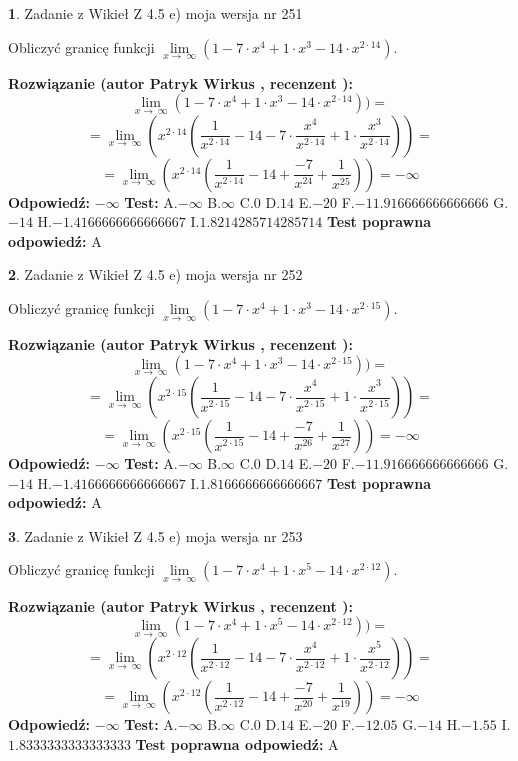 \documentclass[12pt, a4paper]{article}
\theoremstyle{definition} %
\newtheorem{zad}{}
\newcommand{\zadStart}[1]{\begin{zad}#1\newline}
\newcommand{\zadStop}{\end{zad}}
\newcommand{\rozwStart}[2]{\noindent \textbf{Rozwiązanie (autor #1 , recenzent #2): }\newline}
\newcommand{\rozwStop}{\newline}
\newcommand{\odpStart}{\noindent \textbf{Odpowiedź:}\newline}
\newcommand{\odpStop}{\newline}
\newcommand{\testStart}{\noindent \textbf{Test:}\newline}
\newcommand{\testStop}{\newline}
\newcommand{\kluczStart}{\noindent \textbf{Test poprawna odpowiedź:}\newline}
\newcommand{\kluczStop}{\newline}
\begin{document}
\zadStart{Zadanie z Wikieł Z 4.5 e) moja wersja nr 251}


Obliczyć granicę funkcji  $\lim\limits_{x\to\ \infty}(1 - 7 \cdot x^{4}+1 \cdot x^{3}- 14 \cdot x^{2\cdot14})$.
\zadStop
\rozwStart{Patryk Wirkus}{}
$$\lim\limits_{x\to\ \infty}(1 - 7 \cdot x^{4}+1 \cdot x^{3}- 14 \cdot x^{2\cdot14}))=$$
$$=\lim\limits_{x\to\ \infty}(x^{2\cdot14}(\frac{1}{x^{2\cdot14}}-14 -7 \cdot \frac{x^{4}}{x^{2\cdot14}}+1 \cdot \frac{x^{3}}{x^{2\cdot14}}))=$$
$$=\lim\limits_{x\to\ \infty}(x^{2\cdot14}(\frac{1}{x^{2\cdot14}}-14 + \frac{-7}{x^{24}}+ \frac{1}{x^{25}}))=-\infty$$
\rozwStop
\odpStart
$-\infty$
\odpStop
\testStart
A.$-\infty$ B.$\infty$ C.$0$ D.$14$ E.$-20$
F.$-11.916666666666666$ G.$-14$
H.$-1.4166666666666667$
I.$1.8214285714285714$
\testStop
\kluczStart
A
\kluczStop



\zadStart{Zadanie z Wikieł Z 4.5 e) moja wersja nr 252}


Obliczyć granicę funkcji  $\lim\limits_{x\to\ \infty}(1 - 7 \cdot x^{4}+1 \cdot x^{3}- 14 \cdot x^{2\cdot15})$.
\zadStop
\rozwStart{Patryk Wirkus}{}
$$\lim\limits_{x\to\ \infty}(1 - 7 \cdot x^{4}+1 \cdot x^{3}- 14 \cdot x^{2\cdot15}))=$$
$$=\lim\limits_{x\to\ \infty}(x^{2\cdot15}(\frac{1}{x^{2\cdot15}}-14 -7 \cdot \frac{x^{4}}{x^{2\cdot15}}+1 \cdot \frac{x^{3}}{x^{2\cdot15}}))=$$
$$=\lim\limits_{x\to\ \infty}(x^{2\cdot15}(\frac{1}{x^{2\cdot15}}-14 + \frac{-7}{x^{26}}+ \frac{1}{x^{27}}))=-\infty$$
\rozwStop
\odpStart
$-\infty$
\odpStop
\testStart
A.$-\infty$ B.$\infty$ C.$0$ D.$14$ E.$-20$
F.$-11.916666666666666$ G.$-14$
H.$-1.4166666666666667$
I.$1.8166666666666667$
\testStop
\kluczStart
A
\kluczStop



\zadStart{Zadanie z Wikieł Z 4.5 e) moja wersja nr 253}


Obliczyć granicę funkcji  $\lim\limits_{x\to\ \infty}(1 - 7 \cdot x^{4}+1 \cdot x^{5}- 14 \cdot x^{2\cdot12})$.
\zadStop
\rozwStart{Patryk Wirkus}{}
$$\lim\limits_{x\to\ \infty}(1 - 7 \cdot x^{4}+1 \cdot x^{5}- 14 \cdot x^{2\cdot12}))=$$
$$=\lim\limits_{x\to\ \infty}(x^{2\cdot12}(\frac{1}{x^{2\cdot12}}-14 -7 \cdot \frac{x^{4}}{x^{2\cdot12}}+1 \cdot \frac{x^{5}}{x^{2\cdot12}}))=$$
$$=\lim\limits_{x\to\ \infty}(x^{2\cdot12}(\frac{1}{x^{2\cdot12}}-14 + \frac{-7}{x^{20}}+ \frac{1}{x^{19}}))=-\infty$$
\rozwStop
\odpStart
$-\infty$
\odpStop
\testStart
A.$-\infty$ B.$\infty$ C.$0$ D.$14$ E.$-20$
F.$-12.05$ G.$-14$
H.$-1.55$
I.$1.8333333333333333$
\testStop
\kluczStart
A
\kluczStop
\end{document}
